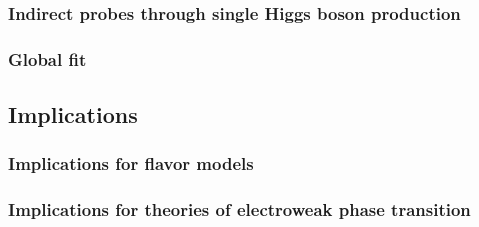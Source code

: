 \documentclass[../report.tex]{subfiles}
\providecommand{\main}{..}
\begin{document}
\subsubsection{Indirect probes through single Higgs boson production}



\subsubsection{Global fit}



\subsection{Implications}

\subsubsection{Implications for flavor models}



\subsubsection{Implications for theories of electroweak phase transition}
\end{document}

